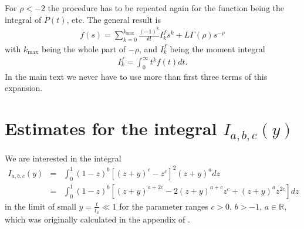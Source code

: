 For $\rho < -2$ the procedure has to be repeated again for the function being the integral of $P(t)$, etc. The general result is
%
\begin{align}
 f(s) = \sum_{k=0}^{k_{\max}} \frac{(-1)^k}{k!} I^{f}_k s^k + L \Gamma(\rho) s^{-\rho}
\end{align}
%
with $k_{\max}$ being the whole part of $-\rho$, and $I^{f}_k$ being the moment integral
\begin{align}
I^{f}_k = \int_0^\infty t^k f(t) dt.
\end{align}
In the main text we never have to use more than first three terms of this expansion. 


\chapter{Estimates for the integral $I_{a,b,c}(y)$ \label{sec:integral}} 

We are interested in the integral 
%
\begin{eqnarray}
I_{a,b,c}(y) &=& \int^{1}_0 (1-z)^{b} [(z+y)^c-z^c]^2 (z+y)^{a}  dz \label{eqn:Iabc1} \\ 
&=& \int^{1}_0 (1-z)^{b} \left[ (z+y)^{a+2c} -2 (z+y)^{a+c} z^{c}  + (z+y)^{a} z^{2c}\right] dz \nonumber 
\end{eqnarray}
%
in the limit of small $y= \frac{t}{t_a} \ll 1$ for the parameter ranges $c > 0$, $b > -1$, $a \in \mathbb{R}$, which was originally calculated in the appendix of \cite{bothe}.

